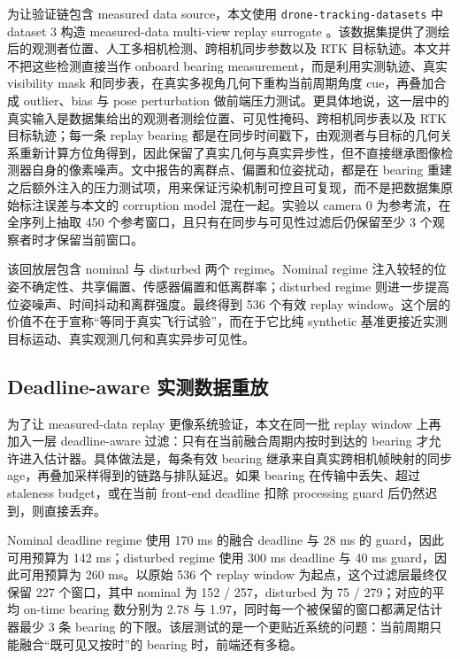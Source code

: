 \documentclass[drones,article,submit,moreauthors]{Definitions/mdpi}
\begin{document}
为让验证链包含 measured data source，本文使用 \texttt{drone-tracking-datasets} 中 dataset 3 构造 measured-data multi-view replay surrogate \cite{albl2020reconstruction}。该数据集提供了测绘后的观测者位置、人工多相机检测、跨相机同步参数以及 RTK 目标轨迹。本文并不把这些检测直接当作 onboard bearing measurement，而是利用实测轨迹、真实 visibility mask 和同步表，在真实多视角几何下重构当前周期角度 cue，再叠加合成 outlier、bias 与 pose perturbation 做前端压力测试。更具体地说，这一层中的真实输入是数据集给出的观测者测绘位置、可见性掩码、跨相机同步表以及 RTK 目标轨迹；每一条 replay bearing 都是在同步时间戳下，由观测者与目标的几何关系重新计算方位角得到，因此保留了真实几何与真实异步性，但不直接继承图像检测器自身的像素噪声。文中报告的离群点、偏置和位姿扰动，都是在 bearing 重建之后额外注入的压力测试项，用来保证污染机制可控且可复现，而不是把数据集原始标注误差与本文的 corruption model 混在一起。实验以 camera 0 为参考流，在全序列上抽取 450 个参考窗口，且只有在同步与可见性过滤后仍保留至少 3 个观察者时才保留当前窗口。

该回放层包含 nominal 与 disturbed 两个 regime。Nominal regime 注入较轻的位姿不确定性、共享偏置、传感器偏置和低离群率；disturbed regime 则进一步提高位姿噪声、时间抖动和离群强度。最终得到 536 个有效 replay window。这个层的价值不在于宣称“等同于真实飞行试验”，而在于它比纯 synthetic 基准更接近实测目标运动、真实观测几何和真实异步可见性。

\subsection{Deadline-aware 实测数据重放}

为了让 measured-data replay 更像系统验证，本文在同一批 replay window 上再加入一层 deadline-aware 过滤：只有在当前融合周期内按时到达的 bearing 才允许进入估计器。具体做法是，每条有效 bearing 继承来自真实跨相机帧映射的同步 age，再叠加采样得到的链路与排队延迟。如果 bearing 在传输中丢失、超过 staleness budget，或在当前 front-end deadline 扣除 processing guard 后仍然迟到，则直接丢弃。

Nominal deadline regime 使用 170 ms 的融合 deadline 与 28 ms 的 guard，因此可用预算为 142 ms；disturbed regime 使用 300 ms deadline 与 40 ms guard，因此可用预算为 260 ms。以原始 536 个 replay window 为起点，这个过滤层最终仅保留 227 个窗口，其中 nominal 为 152 / 257，disturbed 为 75 / 279；对应的平均 on-time bearing 数分别为 2.78 与 1.97，同时每一个被保留的窗口都满足估计器最少 3 条 bearing 的下限。该层测试的是一个更贴近系统的问题：当前周期只能融合“既可见又按时”的 bearing 时，前端还有多稳。
\end{document}
